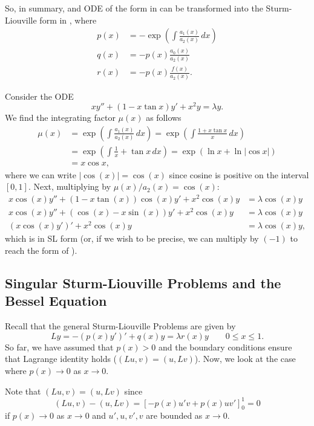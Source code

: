 So, in summary, and ODE of the form in  can be transformed into the Sturm-Liouville form in , where
\begin{align*}
	p(x) &= -\exp\left(\int \frac{a_1(x)}{a_2(x)} \,dx\right) \\
	q(x) &= -p(x)\frac{a_0(x)}{a_2(x)} \\
	r(x) &= -p(x)\frac{f(x)}{a_2(x)}.
\end{align*}

\begin{eg}
	Consider the ODE
	\[
	xy'' + (1-x\tan{x})y' + x^2y = \lambda y.
	\]
	We find the integrating factor $\mu(x)$ as follows
	\begin{align*}
		\mu(x) &= \exp\left(\int \frac{a_1(x)}{a_2(x)} \,dx\right) = \exp\left(\int \frac{1+x\tan{x}}{x} \,dx\right) \\
		&= \exp\left(\int \frac{1}{x} + \tan{x} \,dx\right) = \exp\left(\ln{x} + \ln|\cos{x}|\right) \\
		&= x\cos{x},
	\end{align*}
	where we can write $|\cos(x)| = \cos(x)$ since cosine is positive on the interval $[0,1]$. Next, multiplying by $\mu(x)/a_2(x) = \cos(x)$:
	\begin{align*}
		x\cos(x)y'' + (1-x\tan(x))\cos(x)y' + x^2\cos(x)y &= \lambda \cos(x)y \\
		x\cos(x)y'' + (\cos(x)-x\sin(x))y' + x^2\cos(x)y &= \lambda \cos(x)y \\
		\left(x\cos(x)y'\right)' + x^2\cos(x)y &= \lambda \cos(x)y,
	\end{align*}
	which is in SL form (or, if we wish to be precise, we can multiply by $(-1)$ to reach the form of ).
\end{eg}

\subsection{Singular Sturm-Liouville Problems and the Bessel Equation}\label{sec:singularsl}

Recall that the general Sturm-Liouville Problems are given by
\[
Ly = -\left(p(x)y'\right)' + q(x)y = \lambda r(x) y \qquad 0 \leq x \leq 1.
\]
So far, we have assumed that $p(x) > 0$ and the boundary conditions ensure that Lagrange identity holds ($(Lu, v) = (u, Lv)$). Now, we look at the case where $p(x) \rightarrow 0$ as $x \rightarrow 0$.

Note that $(Lu, v) = (u, Lv)$ since
\[
(Lu, v) - (u, Lv) = \left[-p(x) u' v + p(x) u v' \right]_0^1 = 0
\]
if $p(x) \rightarrow 0$ as $x \rightarrow 0$ and $u', u, v', v$ are bounded as $x \rightarrow 0$.

